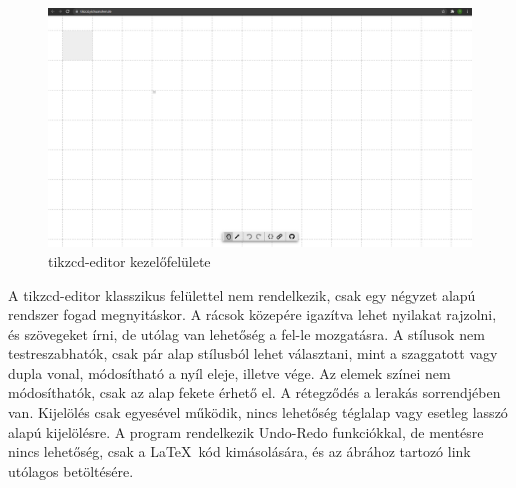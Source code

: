 \begin{figure}[!h]
	\includegraphics[width=\textwidth]{images/tikzcd.png}
	\caption{tikzcd-editor kezelőfelülete \cite{tikzcd}}
	\label{fig:tikzcd}
\end{figure}

\noindent
A tikzcd-editor klasszikus felülettel nem rendelkezik, csak egy négyzet alapú rendszer fogad megnyitáskor. A rácsok közepére igazítva lehet nyilakat rajzolni, és szövegeket írni, de utólag van lehetőség a fel-le mozgatásra. A stílusok nem testreszabhatók, csak pár alap stílusból lehet választani, mint a szaggatott vagy dupla vonal, módosítható a nyíl eleje, illetve vége. Az elemek színei nem módosíthatók, csak az alap fekete érhető el. A rétegződés a lerakás sorrendjében van. Kijelölés csak egyesével működik, nincs lehetőség téglalap vagy esetleg lasszó alapú kijelölésre. A program rendelkezik Undo-Redo funkciókkal, de mentésre nincs lehetőség, csak a \LaTeX\ kód kimásolására, és az ábrához tartozó link utólagos betöltésére.


